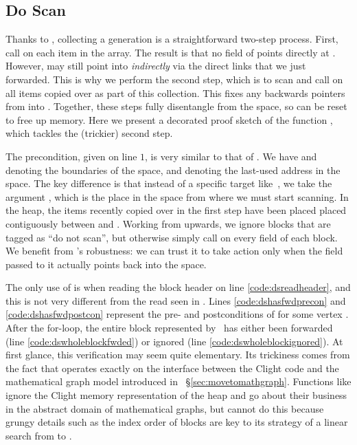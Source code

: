 \subsection{Do Scan}

Thanks to , collecting a generation is a straightforward 
two-step process.
First, call  on each item in the  array. 
The result is that no field of  points directly at . 
However,  may still point into  \emph{indirectly} 
via the direct links that we just forwarded.
This is why we perform the second step, which is to scan  and call 
 on all items copied over as part of this collection. This
fixes any backwards pointers from  into .
Together, these steps fully disentangle  from the 
 space, so  can be reset to free up memory. 
Here we present a decorated proof sketch of the function
, which tackles the (trickier) second step.


The precondition, given on line $1$, is very similar to that of 
. We have  and  denoting the boundaries
of the  space, and  denoting the last-used address
in the  space. The key difference is that instead of a specific
target like~, we take the argument , 
which is the place in the  space from where we must start scanning.
In the heap, the items recently copied over in the first step 
have been placed placed contiguously between  and . 
Working from  upwards, we ignore blocks that are tagged as 
``do not scan'', but otherwise simply call  on every field
of each block. We benefit from 's robustness: we can trust it to 
take action only when the field passed to it actually points back into the 
 space. 

The only use of  is when
reading the block header on line \ref{code:dsreadheader}, 
and this is not very different from the read seen in . 
Lines \ref{code:dshasfwdprecon} and \ref{code:dshasfwdpostcon} 
represent the pre- and postconditions of 
for some vertex . 
After the for-loop, the entire block represented by~ has either been
forwarded (line \ref{code:dswholeblockfwded}) or 
ignored (line \ref{code:dswholeblockignored}). 
At first glance, this verification may seem quite elementary. 
Its trickiness comes from the fact
that  operates exactly on the interface between the Clight code 
and the mathematical graph model introduced in ~\S\ref{sec:movetomathgraph}.
Functions like  ignore the Clight memory representation 
of the heap and go about their business in the abstract domain
of mathematical graphs, but  cannot do this because grungy 
details such as the index order of blocks are key to its strategy of a
linear search from  to . 

